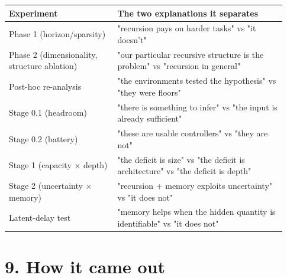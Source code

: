 \documentclass[11pt]{article}
\begin{document}
\begin{center}\small\begin{tabular}{>{\raggedright\arraybackslash}p{0.366\linewidth}>{\raggedright\arraybackslash}p{0.568\linewidth}}
\toprule
Experiment & The two explanations it separates \\
\midrule
Phase 1 (horizon/sparsity) & "recursion pays on harder tasks" vs "it doesn't" \\
Phase 2 (dimensionality, structure ablation) & "our particular recursive structure is the problem" vs "recursion in general" \\
Post-hoc re-analysis & "the environments tested the hypothesis" vs "they were floors" \\
Stage 0.1 (headroom) & "there is something to infer" vs "the input is already sufficient" \\
Stage 0.2 (battery) & "these are usable controllers" vs "they are not" \\
Stage 1 (capacity $\times$ depth) & "the deficit is size" vs "the deficit is architecture" vs "the deficit is depth" \\
Stage 2 (uncertainty $\times$ memory) & "recursion + memory exploits uncertainty" vs "it does not" \\
Latent-delay test & "memory helps when the hidden quantity is identifiable" vs "it does not" \\
\bottomrule
\end{tabular}\end{center}



\section*{9. How it came out}
\end{document}
